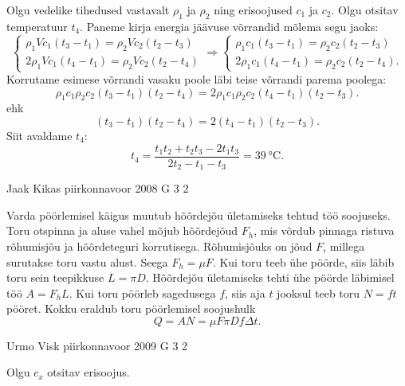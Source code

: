 \documentclass[11pt, twoside]{article}
\begin{document}
{{\ifSolution
Olgu vedelike tihedused vastavalt $\rho_1$ ja $\rho_2$ ning erisoojused $c_1$ ja $c_2$. Olgu otsitav temperatuur $t_4$. Paneme kirja energia jäävuse võrrandid mõlema segu jaoks:
\[
\left\{\begin{array}{l}
	{\rho_{1} V c_{1}\left(t_{3}-t_{1}\right)=\rho_{2} V c_{2}\left(t_{2}-t_{3}\right)} \\ {2 \rho_{1} V c_{1}\left(t_{4}-t_{1}\right)=\rho_{2} V c_{2}\left(t_{2}-t_{4}\right)}\end{array} \Rightarrow\left\{\begin{array}{l}{\rho_{1} c_{1}\left(t_{3}-t_{1}\right)=\rho_{2} c_{2}\left(t_{2}-t_{3}\right)} \\ {2 \rho_{1} c_{1}\left(t_{4}-t_{1}\right)=\rho_{2} c_{2}\left(t_{2}-t_{4}\right).}
\end{array}\right.\right.
\]
Korrutame esimese võrrandi vasaku poole läbi teise võrrandi parema poolega:
\[
\rho_{1} c_{1} \rho_{2} c_{2}\left(t_{3}-t_{1}\right)\left(t_{2}-t_{4}\right) =2 \rho_{1} c_{1} \rho_{2} c_{2}\left(t_{4}-t_{1}\right)\left(t_{2}-t_{3}\right).
\]
ehk
\[
\left(t_{3}-t_{1}\right)\left(t_{2}-t_{4}\right) =2\left(t_{4}-t_{1}\right)\left(t_{2}-t_{3}\right).
\]
Siit avaldame $t_4$:
\[
t_{4}=\frac{t_{1} t_{2}+t_{2} t_{3}-2 t_{1} t_{3}}{2 t_{2}-t_{1}-t_{3}}=\SI{39}{\celsius}.
\]
\fi
}

{Jaak Kikas} %
{piirkonnavoor} %
{2008} %
{G 3} %
{2} %
{

\ifSolution
Varda pöörlemisel käigus muutub hõõrdejõu ületamiseks tehtud töö soojuseks. Toru otspinna ja aluse vahel mõjub hõõrdejõud $F_h$, mis võrdub pinnaga ristuva rõhumisjõu ja hõõrdeteguri korrutisega. Rõhumisjõuks on jõud $F$, millega surutakse toru vastu alust. Seega $F_h = \mu F$. Kui toru teeb ühe pöörde, siis läbib toru sein teepikkuse $L = \pi D$. Hõõrdejõu ületamiseks tehti ühe pöörde läbimisel töö $A = F_hL$. Kui toru pöörleb sagedusega $f$, siis aja $t$ jooksul teeb toru $N = f t$ pööret. Kokku eraldub toru pöörlemisel soojushulk
\[
Q=A N=\mu F \pi D f \Delta t.
\]
\fi
}

{Urmo Visk} %
{piirkonnavoor} %
{2009} %
{G 3} %
{2} %
{

\ifSolution
Olgu $c_x$ otsitav erisoojus.

}}
\end{document}
